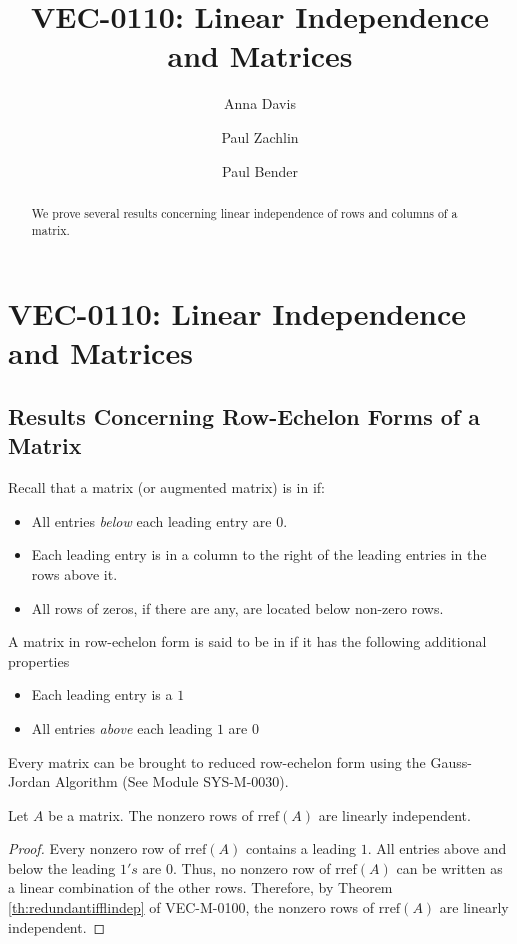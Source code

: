 \documentclass{ximera}
\author{Anna Davis \and Paul Zachlin \and Paul Bender} \title{VEC-0110: Linear Independence and Matrices} \license{CC-BY 4.0}
\begin{document}
\begin{abstract}
We prove several results concerning linear independence of rows and columns of a matrix.
\end{abstract}
\maketitle


\section*{VEC-0110: Linear Independence and Matrices}
\subsection{Results Concerning Row-Echelon Forms of a Matrix}

Recall that a matrix (or augmented matrix) is in  if:
\begin{itemize}
\item All entries {\it below} each leading entry are $0$.
\item Each leading entry is in a column to the right of the leading entries in the rows above it.
\item All rows of zeros, if there are any, are located below non-zero rows.
\end{itemize}

A matrix in row-echelon form is said to be in  if it has the following additional properties
\begin{itemize}
\item Each leading entry is a $1$
\item All entries {\it above} each leading $1$ are $0$
\end{itemize}

Every matrix can be brought to reduced row-echelon form using the Gauss-Jordan Algorithm (See Module SYS-M-0030).

\begin{theorem}\label{th:rowsrreflinind}
Let $A$ be a matrix.  The nonzero rows of $\mbox{rref}(A)$ are linearly independent.
\end{theorem}
\begin{proof}
Every nonzero row of $\mbox{rref}(A)$ contains a leading $1$.  All entries above and below the leading $1's$ are $0$.  Thus, no nonzero row of $\mbox{rref}(A)$ can be written as a linear combination of the other rows.  Therefore, by Theorem \ref{th:redundantifflindep} of VEC-M-0100, the nonzero rows of $\mbox{rref}(A)$ are linearly independent.
\end{proof}
\end{document}
